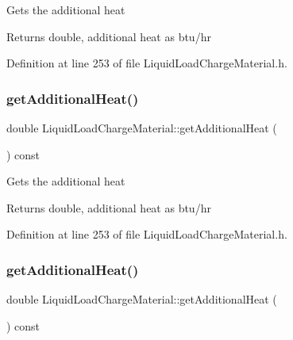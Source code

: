 Gets the additional heat \begin{DoxyReturn}{Returns}
double, additional heat as btu/hr 
\end{DoxyReturn}


Definition at line 253 of file Liquid\+Load\+Charge\+Material.\+h.

\mbox{\label{class_liquid_load_charge_material_a6b79cd1aec59a7f7119a8abfa9e5859b}} 
\subsubsection{\texorpdfstring{get\+Additional\+Heat()}{getAdditionalHeat()}\hspace{0.1cm}{\footnotesize\ttfamily [2/3]}}
{\footnotesize\ttfamily double Liquid\+Load\+Charge\+Material\+::get\+Additional\+Heat (\begin{DoxyParamCaption}{ }\end{DoxyParamCaption}) const\hspace{0.3cm}{\ttfamily [inline]}}

Gets the additional heat \begin{DoxyReturn}{Returns}
double, additional heat as btu/hr 
\end{DoxyReturn}


Definition at line 253 of file Liquid\+Load\+Charge\+Material.\+h.

\mbox{\label{class_liquid_load_charge_material_a6b79cd1aec59a7f7119a8abfa9e5859b}} 
\subsubsection{\texorpdfstring{get\+Additional\+Heat()}{getAdditionalHeat()}\hspace{0.1cm}{\footnotesize\ttfamily [3/3]}}
{\footnotesize\ttfamily double Liquid\+Load\+Charge\+Material\+::get\+Additional\+Heat (\begin{DoxyParamCaption}{ }\end{DoxyParamCaption}) const\hspace{0.3cm}{\ttfamily [inline]}}

